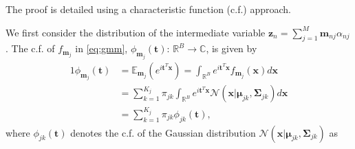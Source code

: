 \documentclass[twocolumn,english]{IEEEtran}
\theoremstyle{plain}
\begin{document}
The proof is detailed using a characteristic function (c.f.) approach.

We first consider the distribution of the intermediate variable $\mathbf{z}_{n}=\sum_{j=1}^{M}\mathbf{m}_{nj}\alpha_{nj}$.
The c.f. of $f_{\mathbf{m}_{j}}$ in \eqref{eq:gmm}, $\phi_{\mathbf{m}_{j}}\left(\mathbf{t}\right):\,\mathbb{R}^{B}\rightarrow\mathbb{C}$,
is given by
\begin{alignat}{1}
\phi_{\mathbf{m}_{j}}\left(\mathbf{t}\right) & =\mathbb{E}_{\mathbf{m}_{j}}\left(e^{i\mathbf{t}^{T}\mathbf{x}}\right)=\int_{\mathbb{R}^{B}}e^{i\mathbf{t}^{T}\mathbf{x}}f_{\mathbf{m}_{j}}\left(\mathbf{x}\right)d\mathbf{x}\nonumber \\
 & =\sum_{k=1}^{K_{j}}\pi_{jk}\int_{\mathbb{R}^{B}}e^{i\mathbf{t}^{T}\mathbf{x}}\mathcal{N}\left(\mathbf{x}\vert\boldsymbol{\mu}_{jk},\boldsymbol{\Sigma}_{jk}\right)d\mathbf{x}\nonumber \\
 & =\sum_{k=1}^{K_{j}}\pi_{jk}\phi_{jk}\left(\mathbf{t}\right),\label{eq:cf_mj}
\end{alignat}
where $\phi_{jk}\left(\mathbf{t}\right)$ denotes the c.f. of the
Gaussian distribution $\mathcal{N}\left(\mathbf{x}\vert\boldsymbol{\mu}_{jk},\boldsymbol{\Sigma}_{jk}\right)$
as
\end{document}
